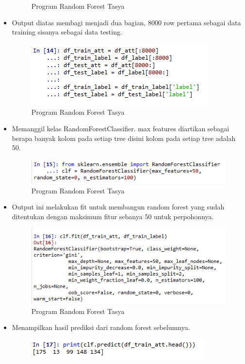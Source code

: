 \begin{itemize}
\begin{figure}[ht]
\caption{Program Random Forest Tasya}
\label{Praktek}
\end{figure}
\item Output diatas membagi menjadi dua bagian, 8000 row pertama sebagai data training sisanya sebagai data testing.
\begin{figure}[ht]
\centering
\includegraphics[scale=0.5]{figures/rf14.png}
\caption{Program Random Forest Tasya}
\label{Praktek}
\end{figure}
\item Memanggil kelas RandomForestClassifier. max features diartikan sebagai berapa banyak kolom pada setiap tree disini kolom pada setiap tree adalah 50.
\begin{figure}[ht]
\centering
\includegraphics[scale=0.5]{figures/rf15.png}
\caption{Program Random Forest Tasya}
\label{Praktek}
\end{figure}
\item Output ini melakukan fit untuk membangun random forest yang sudah ditentukan dengan maksimum fitur sebanya 50 untuk perpohonnya.
\begin{figure}[ht]
\centering
\includegraphics[scale=0.5]{figures/rf16.png}
\caption{Program Random Forest Tasya}
\label{Praktek}
\end{figure}
\item Menampilkan hasil prediksi dari random forest sebelumnya.
\begin{figure}[ht]
\centering
\includegraphics[scale=0.5]{figures/rf17.png}

\end{figure}
\end{itemize}
